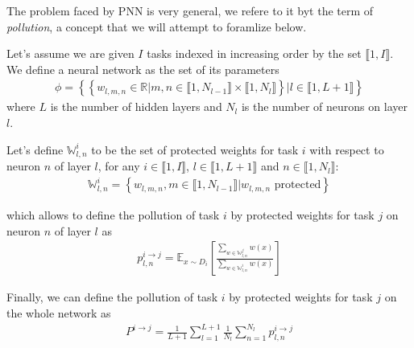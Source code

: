 \documentclass[11pt]{article}
\newcommand{\intset}[2]{\llbracket #1, #2 \rrbracket}
\begin{document}
\vspace{2mm}
\noindent
The problem faced by PNN is very general, we refere to it byt the term of \textit{pollution}, a concept that we will attempt to foramlize below.

\vspace{2mm}
\noindent
Let's assume we are given $I$ tasks indexed in increasing order by the set $\intset{1}{I}$. We define a neural network as the set of its parameters
\begin{align}
    \phi = \left\{\left\{ w_{l,m,n} \in \mathbb{R} | m,n \in \llbracket 1, N_{l-1} \rrbracket \times \llbracket 1, N_{l} \rrbracket \right\} | l \in \llbracket 1, L+1 \rrbracket \right\}
\end{align}
where $L$ is the number of hidden layers and $N_l$ is the number of neurons on layer $l$.

\vspace{2mm}
\noindent
Let's define $\mathbb{W}_{l,n}^i$ to be the set of protected weights for task $i$ with respect to neuron $n$ of layer $l$, for any $i \in \intset{1}{I}$, $l \in \intset{1}{L+1}$ and $n \in \intset{1}{N_l}$:
\begin{align}
    \mathbb{W}_{l,n}^i = \left\{ w_{l,m,n}, m \in \intset{1}{N_{l-1}} | w_{l,m,n} \text{ protected} \right\}
\end{align}

\vspace{2mm}
\noindent
which allows to define the pollution of task $i$ by protected weights for task $j$ on neuron $n$ of layer $l$ as
\begin{align}
    p_{l,n}^{i\rightarrow j} = \mathbb{E}_{x \sim D_i}\left[\frac{\sum_{w \in \mathbb{W}_{l,n}^j}{w(x)}}{\sum_{w \in \mathbb{W}_{l,n}^i}{w(x)}}\right]
\end{align}

\vspace{2mm}
\noindent
Finally, we can define the pollution of task $i$ by protected weights for task $j$ on the whole network as
\begin{align}
    P^{i\rightarrow j} = \frac{1}{L+1}\sum_{l=1}^{L+1}{\frac{1}{N_l}\sum_{n=1}^{N_l}{p_{l,n}^{i\rightarrow j}}}
\end{align}
\end{document}
